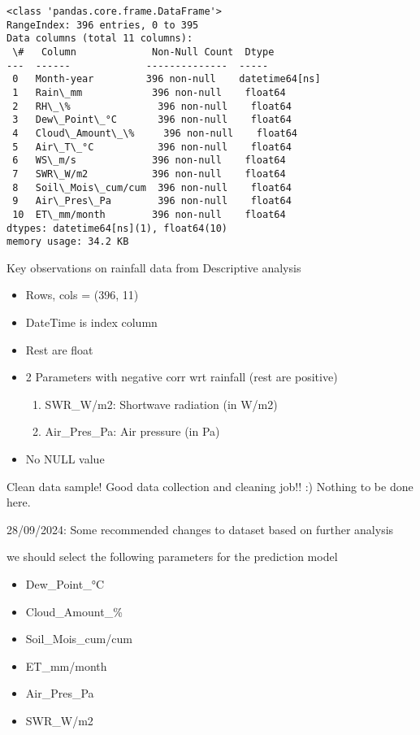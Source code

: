 \documentclass[11pt]{article}
\providecommand{\tightlist}{%
      \setlength{\itemsep}{0pt}\setlength{\parskip}{0pt}}
\begin{document}
    \begin{Verbatim}[commandchars=\\\{\}]
<class 'pandas.core.frame.DataFrame'>
RangeIndex: 396 entries, 0 to 395
Data columns (total 11 columns):
 \#   Column             Non-Null Count  Dtype
---  ------             --------------  -----
 0   Month-year         396 non-null    datetime64[ns]
 1   Rain\_mm            396 non-null    float64
 2   RH\_\%               396 non-null    float64
 3   Dew\_Point\_°C       396 non-null    float64
 4   Cloud\_Amount\_\%     396 non-null    float64
 5   Air\_T\_°C           396 non-null    float64
 6   WS\_m/s             396 non-null    float64
 7   SWR\_W/m2           396 non-null    float64
 8   Soil\_Mois\_cum/cum  396 non-null    float64
 9   Air\_Pres\_Pa        396 non-null    float64
 10  ET\_mm/month        396 non-null    float64
dtypes: datetime64[ns](1), float64(10)
memory usage: 34.2 KB
    \end{Verbatim}

    Key observations on rainfall data from Descriptive analysis

\begin{itemize}
\tightlist
\item
  Rows, cols = (396, 11)
\item
  DateTime is index column
\item
  Rest are float
\item
  2 Parameters with negative corr wrt rainfall (rest are positive)

  \begin{enumerate}
  \def\labelenumi{\arabic{enumi}.}
  \tightlist
  \item
    SWR\_W/m2: Shortwave radiation (in W/m2)
  \item
    Air\_Pres\_Pa: Air pressure (in Pa)
  \end{enumerate}
\item
  No NULL value
\end{itemize}

Clean data sample! Good data collection and cleaning job!! :) Nothing to
be done here.

    28/09/2024: Some recommended changes to dataset based on further
analysis

we should select the following parameters for the prediction model

\begin{itemize}
\tightlist
\item
  Dew\_Point\_°C
\item
  Cloud\_Amount\_\%
\item
  Soil\_Mois\_cum/cum
\item
  ET\_mm/month
\item
  Air\_Pres\_Pa
\item
  SWR\_W/m2
\end{itemize}
\end{document}
